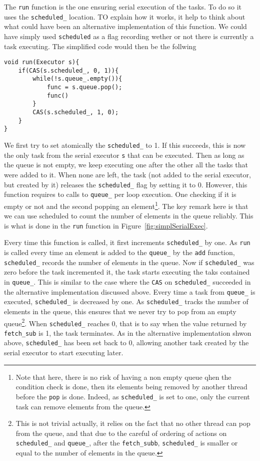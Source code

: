 The \texttt{run} function is the one ensuring serial execution of the tasks. To do so it uses the \texttt{scheduled\_} location. TO explain how it works, it help to think about what could have been an alternative implementation of this function. We could have simply used \texttt{scheduled} as a flag recording wether or not there is currently a task executing. The simplified code would then be the follwing

\begin{lstlisting}
void run(Executor s){
	if(CAS(s.scheduled_, 0, 1)){
		while(!s.queue_.empty()){
			func = s.queue.pop();
			func()
		}
		CAS(s.scheduled_, 1, 0);
	}
}
\end{lstlisting}

We first try to set atomically the \texttt{scheduled\_} to 1. If this succeeds, this is now the only task from the serial executor \texttt{s} that can be executed. Then as long as the queue is not empty, we keep executing one after the other all the tasks that were added to it. When none are left, the task (not added to the serial executor, but created by it) releases the \texttt{scheduled\_} flag by setting it to 0. However, this function requires to calls to \texttt{queue\_} per loop execution. One checking if it is empty or not and the second popping an element\footnote{Note that here, there is no risk of having a non empty queue qhen the condition check is done, then its elements being removed by another thread before the \texttt{pop} is done. Indeed, as \texttt{scheduled\_} is set to one, only the current task can remove elements from the queue.}. The key remark here is that we can use scheduled to count the number of elements in the queue reliably. This is what is done in the \texttt{run} function in Figure~\ref{fig:simplSerialExec}.

Every time this function is called, it first increments \texttt{scheduled\_} by one. As \texttt{run} is called every time an element is added to the \texttt{queue\_} by the \texttt{add} function, \texttt{scheduled\_} records the number of elements in the queue. Now if \texttt{scheduled\_} was zero before the task incremented it, the task starts executing the taks contained in \texttt{queue\_}. This is similar to the case where the \texttt{CAS} on \texttt{scheduled\_} succeeded in the alternative implementation discussed above. Every time a task from \texttt{queue\_} is executed, \texttt{scheduled\_} is decreased by one. As \texttt{scheduled\_} tracks the number of elements in the queue, this ensures that we never try to pop from an empty queue\footnote{This is not trivial actually, it relies on the fact that no other thread can pop from the queue, and that due to the careful of ordering of actions on \texttt{scheduled\_} and \texttt{queue\_}, after the \texttt{fetch\_subb}, \texttt{scheduled\_} is smaller or equal to the number of elements in the queue.}. When \texttt{scheduled\_} reaches 0, that is to say when the value returned by \texttt{fetch\_sub} is 1, the task terminates. As in the alternative implementation shwon above, \texttt{scheduled\_} has been set back to 0, allowing another task created by the serial executor to start executing later.

